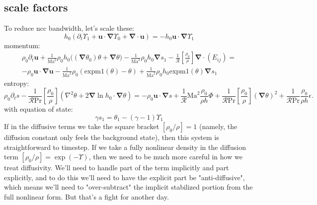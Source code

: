 \documentclass{aastex631}
\newcommand{\del}{\nabla}
\renewcommand{\vec}{\boldsymbol}
\newcommand{\grad}{\vec{\del}}
\newcommand{\scrR}{\mathcal{R}}
\newcommand{\Ma}{\mathrm{Ma}}
\renewcommand{\Pr}{\mathrm{Pr}}
\newcommand{\expm}{\mathrm{expm1}}
\begin{document}
\subsection{scale factors}
To reduce ncc bandwidth, let's scale these:
\begin{equation}
    h_0 \left(\partial_t \Upsilon_1 + \vec{u}\cdot\grad \Upsilon_0 + \grad \cdot \vec{u}\right) = - h_0 \vec{u}\cdot\grad \Upsilon_1
\end{equation}
momentum:
\begin{multline}
  \rho_0 \partial_t \vec{u}
  + \frac{1}{\Ma^2}\rho_0 h_0 \Bigg((\grad \theta_0)\theta  + \grad \theta \Bigg)
  - \frac{1}{\Ma^2} \rho_0 h_0 \grad s_1
  - \frac{1}{\scrR}\left[\frac{\rho_0}{\rho}\right] \grad \cdot (E_{ij})
  = \\
  -\rho_0 \vec{u}\cdot\grad\vec{u}
  -\frac{1}{\Ma^2} \rho_0 \left(\expm(\theta)-\theta\right)
  + \frac{1}{\Ma^2} \rho_0 h_0 \expm(\theta) \grad s_1
\end{multline}
entropy:
\begin{equation}
  \rho_0 \partial_t s
  - \frac{1}{\scrR \Pr} \left[\frac{\rho_0}{\rho}\right]\left(\nabla^2 \theta + 2 \grad \ln h_0 \cdot \grad \theta \right)
  =
  - \rho_0 \vec{u}\cdot\grad s
  + \frac{1}{\scrR} \Ma^2  \frac{\rho_0}{\rho h} \Phi
  + \frac{1}{\scrR \Pr} \left[\frac{\rho_0}{\rho}\right] (\grad \theta)^2
  + \frac{1}{\scrR \Pr} \frac{\rho_0}{\rho h} \epsilon.
\end{equation}
with equation of state:
\begin{equation}
  \gamma s_1 = \theta_1 - (\gamma - 1)\Upsilon_1
\end{equation}
If in the diffusive terms we take the square bracket $[\rho_0/\rho] = 1$ (namely, the diffusion constant only feels the background state), then this system is straightforward to timestep.  If we take a fully nonlinear density in the diffusion term $[\rho_0/\rho] = \exp(-\Upsilon)$, then we need to be much more careful in how we treat diffusivity.  We'll need to handle part of the term implicitly and part explicitly, and to do this we'll need to have the explicit part be "anti-diffusive", which means we'll need to "over-subtract" the implicit stabilized portion from the full nonlinear form.  But that's a fight for another day.

\newpage
\end{document}
